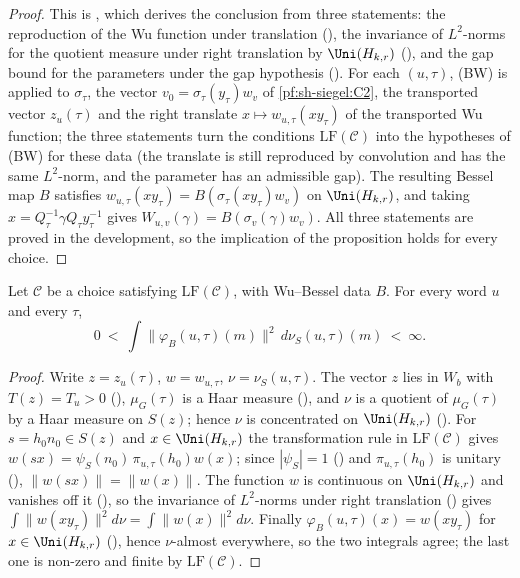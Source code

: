 \begin{proof}
This is , which derives the conclusion from three statements:
the reproduction of the Wu function under translation (),
the invariance of $L^2$-norms for the quotient measure under right translation by $\Uni(H_{k,r})$
(), and the gap bound for the parameters under the gap
hypothesis (). For each $(u,\tau)$, (BW) is applied to
$\sigma_\tau$, the vector $v_0=\sigma_\tau(y_\tau)w_v$ of \ref{pf:sh-siegel:C2}, the transported vector $z_u(\tau)$ and the right
translate $x\mapsto w_{u,\tau}(xy_\tau)$ of the transported Wu function; the three statements turn the conditions
$\mathrm{LF}(\mathcal C)$ into the hypotheses of (BW) for these data (the translate is still reproduced by convolution and has
the same $L^2$-norm, and the parameter has an admissible gap). The resulting Bessel map $B$ satisfies
$w_{u,\tau}(xy_\tau)=B(\sigma_\tau(xy_\tau)w_v)$ on $\Uni(H_{k,r})$, and taking $x=Q_\tau^{-1}\gamma Q_\tau y_\tau^{-1}$
gives $W_{u,v}(\gamma)=B(\sigma_v(\gamma)w_v)$. All three statements are proved in the development, so the implication of
the proposition holds for every choice.
\end{proof}

\begin{proposition}\label{pf:sh-siegel:l2phi}
Let $\mathcal C$ be a choice satisfying $\mathrm{LF}(\mathcal C)$, with Wu--Bessel data $B$. For every word $u$ and every
$\tau$,
\[
0\ <\ \int\bigl\|\varphi_B(u,\tau)(m)\bigr\|^2\,d\nu_S(u,\tau)(m)\ <\ \infty .
\]
\end{proposition}

\begin{proof}
Write $z=z_u(\tau)$, $w=w_{u,\tau}$, $\nu=\nu_S(u,\tau)$. The vector $z$ lies in $W_b$ with $T(z)=T_u>0$
(), $\mu_G(\tau)$ is a Haar measure (), and $\nu$ is a
quotient of $\mu_G(\tau)$ by a Haar measure on $S(z)$; hence $\nu$ is concentrated on $\Uni(H_{k,r})$
(). For $s=h_0n_0\in S(z)$ and $x\in\Uni(H_{k,r})$ the transformation rule in
$\mathrm{LF}(\mathcal C)$ gives $w(sx)=\psi_S(n_0)\,\pi_{u,\tau}(h_0)w(x)$; since $|\psi_S|=1$
() and $\pi_{u,\tau}(h_0)$ is unitary
(), $\|w(sx)\|=\|w(x)\|$. The function $w$ is continuous on
$\Uni(H_{k,r})$ and vanishes off it (), so the invariance of $L^2$-norms under right
translation () gives
$\int\|w(xy_\tau)\|^2d\nu=\int\|w(x)\|^2d\nu$. Finally $\varphi_B(u,\tau)(x)=w(xy_\tau)$ for $x\in\Uni(H_{k,r})$
(), hence $\nu$-almost everywhere, so the two integrals agree; the last one is
non-zero and finite by $\mathrm{LF}(\mathcal C)$.
\end{proof}


